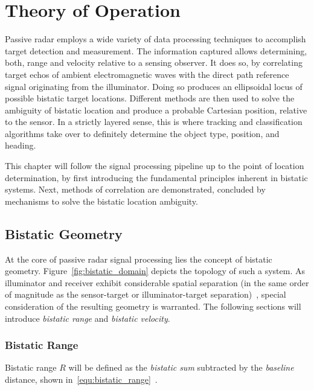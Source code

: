 \chapter{Theory of Operation}\label{chp:theory_of_operation}

Passive radar employs a wide variety of data processing techniques to accomplish target detection and measurement. The information captured allows determining, both, range and velocity relative to a sensing observer. It does so, by correlating target echos of ambient electromagnetic waves with the direct path reference signal originating from the illuminator. Doing so produces an ellipsoidal locus of possible bistatic target locations. Different methods are then used to solve the ambiguity of bistatic location and produce a probable Cartesian position, relative to the sensor. In a strictly layered sense, this is where tracking and classification algorithms take over to definitely determine the object type, position, and heading.

This chapter will follow the signal processing pipeline up to the point of location determination, by first introducing the fundamental principles inherent in bistatic systems. Next, methods of correlation are demonstrated, concluded by mechanisms to solve the bistatic location ambiguity.

\section{Bistatic Geometry}\label{sct:bistatic_geometry}

At the core of passive radar signal processing lies the concept of bistatic geometry. Figure~\ref{fig:bistatic_domain} depicts the topology of such a system. As illuminator and receiver exhibit considerable spatial separation (in the same order of magnitude as the sensor-target or illuminator-target separation)~\cite[p.~1571]{Griffiths2010}, special consideration of the resulting geometry is warranted. The following sections will introduce \emph{bistatic range} and \emph{bistatic velocity}.

\subsection{Bistatic Range}

Bistatic range \(R\) will be defined as the \emph{bistatic sum} subtracted by the \emph{baseline} distance, shown in~\ref{equ:bistatic_range}~\cite[p.~10]{Malanowski2019}.

